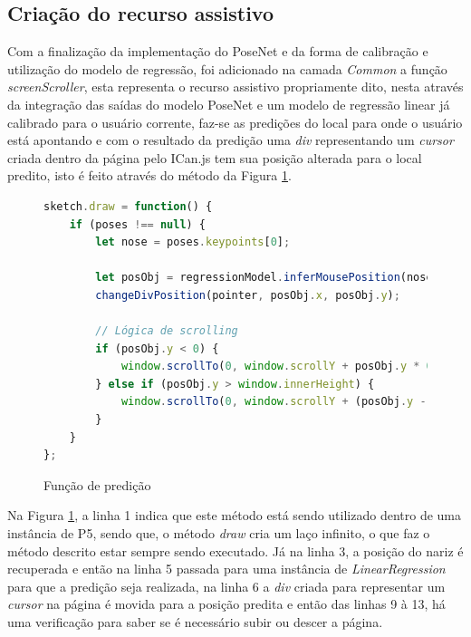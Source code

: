 \subsection{Criação do recurso assistivo}

\par Com a finalização da implementação do PoseNet e da forma de calibração e utilização do modelo de regressão, foi adicionado na camada \textit{Common} a função \textit{screenScroller}, esta representa o recurso assistivo propriamente dito, nesta através da integração das saídas do modelo PoseNet e um modelo de regressão linear já calibrado para o usuário corrente, faz-se as predições do local para onde o usuário está apontando e com o resultado da predição uma \textit{div} representando um \textit{cursor} criada dentro da página pelo ICan.js tem sua posição alterada para o local predito, isto é feito através do método da Figura \ref{figure:funcao_predicao}.

\begin{figure}[H]
    \centering
    \caption{Função de predição}
    \begin{lstlisting}[language=JavaScript]
sketch.draw = function() {
    if (poses !== null) {
        let nose = poses.keypoints[0];

        let posObj = regressionModel.inferMousePosition(nose);
        changeDivPosition(pointer, posObj.x, posObj.y);

        // Lógica de scrolling
        if (posObj.y < 0) {
            window.scrollTo(0, window.scrollY + posObj.y * 0.05);
        } else if (posObj.y > window.innerHeight) {
            window.scrollTo(0, window.scrollY + (posObj.y - window.innerHeight) * 0.03);
        }
    }
};
    \end{lstlisting}
    \label{figure:funcao_predicao}
\end{figure}

\par Na Figura \ref{figure:funcao_predicao}, a linha 1 indica que este método está sendo utilizado dentro de uma instância de P5, sendo que, o método \textit{draw} cria um laço infinito, o que faz o método descrito estar sempre sendo executado. Já na linha 3, a posição do nariz é recuperada e então na linha 5 passada para uma instância de \textit{LinearRegression} para que a predição seja realizada, na linha 6 a \textit{div} criada para representar um \textit{cursor} na página é movida para a posição predita e então das linhas 9 à 13, há uma verificação para saber se é necessário subir ou descer a página.

